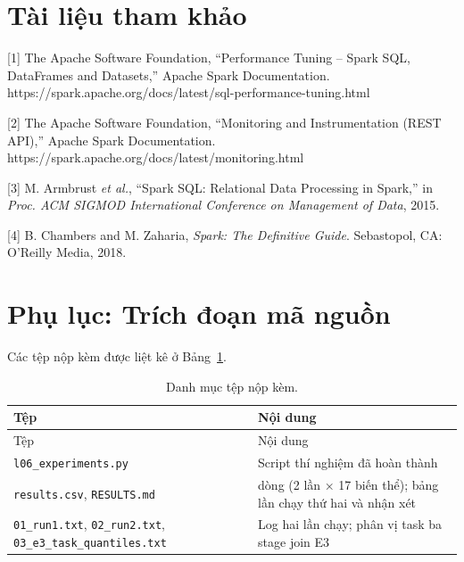 \documentclass[
  12pt,
  a4paper,
]{report}
\begin{document}
\section*{Tài liệu tham khảo}\label{tuxe0i-liux1ec7u-tham-khux1ea3o-5}

{[}1{]} The Apache Software Foundation, ``Performance Tuning -- Spark
SQL, DataFrames and Datasets,'' Apache Spark Documentation.
https://spark.apache.org/docs/latest/sql-performance-tuning.html

{[}2{]} The Apache Software Foundation, ``Monitoring and Instrumentation
(REST API),'' Apache Spark Documentation.
https://spark.apache.org/docs/latest/monitoring.html

{[}3{]} M. Armbrust \emph{et al.}, ``Spark SQL: Relational Data
Processing in Spark,'' in \emph{Proc. ACM SIGMOD International
Conference on Management of Data}, 2015.

{[}4{]} B. Chambers and M. Zaharia, \emph{Spark: The Definitive Guide}.
Sebastopol, CA: O'Reilly Media, 2018.

\section*{Phụ lục: Trích đoạn mã
nguồn}\label{phux1ee5-lux1ee5c-truxedch-ux111oux1ea1n-muxe3-nguux1ed3n-3}

Các tệp nộp kèm được liệt kê ở Bảng~\ref{tbl:l06-files}.

\begin{longtable}[]{@{}
  >{\raggedright\arraybackslash}p{}
  >{\raggedright\arraybackslash}p{}@{}}
\caption{\label{tbl:l06-files}Danh mục tệp nộp kèm.}\tabularnewline
\toprule\noalign{}
\begin{minipage}[b]{\linewidth}\raggedright
Tệp
\end{minipage} & \begin{minipage}[b]{\linewidth}\raggedright
Nội dung
\end{minipage} \\
\midrule\noalign{}
\endfirsthead
\toprule\noalign{}
\begin{minipage}[b]{\linewidth}\raggedright
Tệp
\end{minipage} & \begin{minipage}[b]{\linewidth}\raggedright
Nội dung
\end{minipage} \\
\midrule\noalign{}
\endhead
\bottomrule\noalign{}
\endlastfoot
\texttt{l06\_}\allowbreak{}\texttt{experiments.}\allowbreak{}\texttt{py}\allowbreak{}
& Script thí nghiệm đã hoàn thành \\
\texttt{results.csv}, \texttt{RESULTS.md} & 34 dòng (2 lần × 17 biến
thể); bảng lần chạy thứ hai và nhận xét \\
\texttt{01\_run1.txt}, \texttt{02\_run2.txt},
\texttt{03\_}\allowbreak{}\texttt{e3\_}\allowbreak{}\texttt{task\_}\allowbreak{}\texttt{quantiles.}\allowbreak{}\texttt{txt}\allowbreak{}
& Log hai lần chạy; phân vị task ba stage join E3 \\
\end{longtable}
\end{document}
